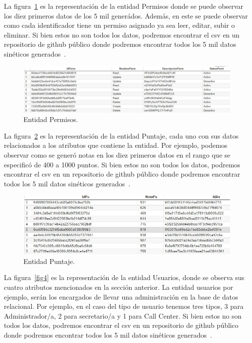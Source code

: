 \documentclass[10pt, oneside,spanish]{article}   	%
\begin{document}
La figura~\ref{fig2} es la representación de la entidad Permisos donde se puede observar los diez primeros datos de los 5 mil generádos. Además, en este se puede observar como cada identificador tiene un permiso asignado ya sea leer, editar, subir o eliminar. Si bien estos no son todos los datos, podremos encontrar el csv en un repositorio de github público donde podremos encontrar todos los 5 mil datos sinéticos generados~\cite{permiso,permisocsv}.

\begin{figure}[H] 
        \centering \includegraphics[width=1\columnwidth]{TablaPermisos.jpg}
        \caption{\label{fig2}Entidad Permisos.
        }
\end{figure}

La figura~\ref{fig3} es la representación de la entidad Puntaje, cada uno con sus datos relacionados a los atributos que contiene la entidad. Por ejemplo, podemos observar como se generó notas en los diez primeros datos en el rango que se especificó de 400 a 1000 puntos. Si bien estos no son todos los datos, podremos encontrar el csv en un repositorio de github público donde podremos encontrar todos los 5 mil datos sinéticos generados~\cite{puntaje,puntajecsv}.

\begin{figure}[H] 
        \centering \includegraphics[width=1\columnwidth]{TablaPuntaje.jpg}
        \caption{\label{fig3}Entidad Puntaje.
        }
\end{figure}

La figura~\ref{fig4} es la representación de la entidad Usuarios, donde se observa sus cuatro atributos mencionados en la sección anterior. La entidad usuarios por ejemplo, serán los encargados de llevar una administración en la base de datos relacional. Por ejemplo, en el caso del tipo de usuario tenemos tres tipos, 3 para Administrador/a, 2 para secretario/a y 1 para Call Center. Si bien estos no son todos los datos, podremos encontrar el csv en un repositorio de github público donde podremos encontrar todos los 5 mil datos sinéticos generados~\cite{usuario,usuariocsv}.
\end{document}
